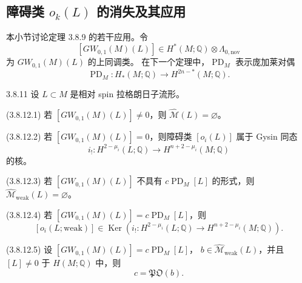 \subsection{障碍类 $o_k(L)$ 的消失及其应用}
\label{subsec:3-8-2}

本小节讨论定理 3.8.9 的若干应用。令
\[
 [GW_{0,1}(M)(L)]
 \in H^*(M;\mathbb Q)\otimes\Lambda_{0,\mathrm{nov}}
\]
为 $GW_{0,1}(M)(L)$ 的上同调类。
在下一个定理中，$\operatorname{PD}_M$ 表示庞加莱对偶
\[
 \operatorname{PD}_M\colon
 H_*(M;\mathbb Q)\longrightarrow H^{2n-*}(M;\mathbb Q).
\]

\begin{theorem}{3.8.11}\label{thm:3-8-11}
设 $L\subset M$ 是相对 spin 拉格朗日子流形。

\smallskip
\noindent\textup{(3.8.12.1)}
若 $[GW_{0,1}(M)(L)]\ne0$，则
$\widehat{\mathcal M}(L)=\varnothing$。

\noindent\textup{(3.8.12.2)}
若 $[GW_{0,1}(M)(L)]=0$，则障碍类 $[o_i(L)]$ 属于 Gysin 同态
\[
 i_!\colon H^{2-\mu_i}(L;\mathbb Q)
 \longrightarrow H^{n+2-\mu_i}(M;\mathbb Q)
\]
的核。

\noindent\textup{(3.8.12.3)}
若 $[GW_{0,1}(M)(L)]$ 不具有
$c\operatorname{PD}_M[L]$ 的形式，则
$\widehat{\mathcal M}_{\mathrm{weak}}(L)=\varnothing$。

\noindent\textup{(3.8.12.4)}
若
$[GW_{0,1}(M)(L)]=c\operatorname{PD}_M[L]$，则
\[
 [o_i(L;\mathrm{weak})]
 \in
 \operatorname{Ker}\left(
 i_!\colon H^{2-\mu_i}(L;\mathbb Q)
 \longrightarrow H^{n+2-\mu_i}(M;\mathbb Q)
 \right).
\]

\noindent\textup{(3.8.12.5)}
设 $[GW_{0,1}(M)(L)]=c\operatorname{PD}_M[L]$，
$b\in\widehat{\mathcal M}_{\mathrm{weak}}(L)$，并且
$[L]\ne0$ 于 $H(M;\mathbb Q)$ 中，则
\[
 c=\mathfrak{PO}(b).
\]
\end{theorem}


